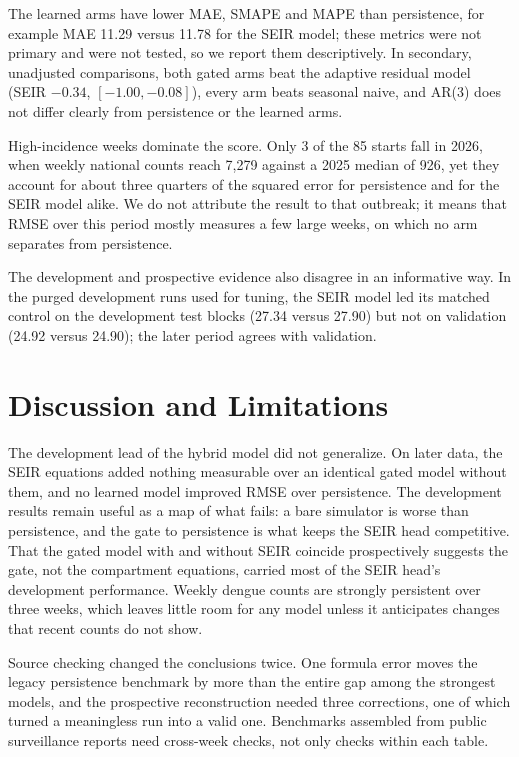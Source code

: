 \documentclass[conference]{IEEEtran}
\begin{document}
The learned arms have lower MAE, SMAPE and MAPE than persistence, for example MAE 11.29 versus 11.78 for the SEIR model; these metrics were not primary and were not tested, so we report them descriptively. %
In secondary, unadjusted comparisons, both gated arms beat the adaptive residual model (SEIR $-0.34$, $[-1.00, -0.08]$), every arm beats seasonal naive, and AR(3) does not differ clearly from persistence or the learned arms. %

High-incidence weeks dominate the score.
Only 3 of the 85 starts fall in 2026, when weekly national counts reach 7{,}279 against a 2025 median of 926, yet they account for about three quarters of the squared error for persistence and for the SEIR model alike. %
We do not attribute the result to that outbreak; it means that RMSE over this period mostly measures a few large weeks, on which no arm separates from persistence.

The development and prospective evidence also disagree in an informative way.
In the purged development runs used for tuning, the SEIR model led its matched control on the development test blocks (27.34 versus 27.90) but not on validation (24.92 versus 24.90); the later period agrees with validation. %

\section{Discussion and Limitations}\label{sec:discussion}
The development lead of the hybrid model did not generalize.
On later data, the SEIR equations added nothing measurable over an identical gated model without them, and no learned model improved RMSE over persistence.
The development results remain useful as a map of what fails: a bare simulator is worse than persistence, and the gate to persistence is what keeps the SEIR head competitive.
That the gated model with and without SEIR coincide prospectively suggests the gate, not the compartment equations, carried most of the SEIR head's development performance.
Weekly dengue counts are strongly persistent over three weeks, which leaves little room for any model unless it anticipates changes that recent counts do not show.

Source checking changed the conclusions twice.
One formula error moves the legacy persistence benchmark by more than the entire gap among the strongest models, and the prospective reconstruction needed three corrections, one of which turned a meaningless run into a valid one.
Benchmarks assembled from public surveillance reports need cross-week checks, not only checks within each table.
\end{document}
